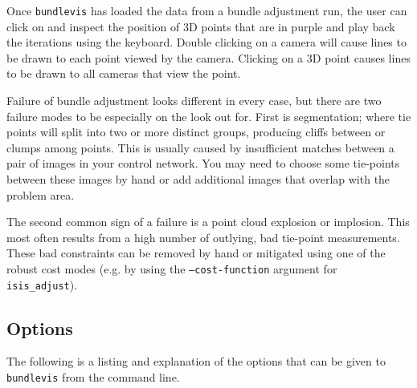 Once \texttt{bundlevis} has loaded the data from a bundle adjustment run,
the user can click on and inspect the position of 3D points that are
in purple and play back the iterations using the keyboard. Double
clicking on a camera will cause lines to be drawn to each point viewed
by the camera. Clicking on a 3D point causes lines to be drawn to all
cameras that view the point.

Failure of bundle adjustment looks different in every case, but there
are two failure modes to be especially on the look out for. First is
segmentation; where tie points will split into two or more distinct
groups, producing cliffs between or clumps among points. This is
usually caused by insufficient matches between a
pair of images in your control network.  You may need to choose some
tie-points between these images by hand or add additional images that
overlap with the problem area.

The second common sign of a failure is a point cloud explosion or
implosion. This most often results from a high number of outlying,
bad tie-point measurements. These bad constraints can be removed by
hand or mitigated using one of the robust cost modes (e.g. by using
the \texttt{--cost-function} argument for \texttt{isis\_adjust}).

\subsection{Options}

The following is a listing and explanation of the options
that can be given to \texttt{bundlevis} from the command line.

